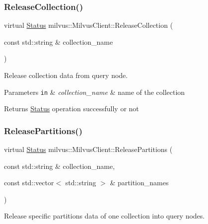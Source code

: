 \subsubsection{\texorpdfstring{Release\+Collection()}{ReleaseCollection()}}
{\footnotesize\ttfamily virtual \hyperlink{classmilvus_1_1_status}{Status} milvus\+::\+Milvus\+Client\+::\+Release\+Collection (\begin{DoxyParamCaption}\item[{const std\+::string \&}]{collection\+\_\+name }\end{DoxyParamCaption})\hspace{0.3cm}{\ttfamily [pure virtual]}}

Release collection data from query node.


\begin{DoxyParams}[1]{Parameters}
\mbox{\tt in}  & {\em collection\+\_\+name} & name of the collection \\
\hline
\end{DoxyParams}
\begin{DoxyReturn}{Returns}
\hyperlink{classmilvus_1_1_status}{Status} operation successfully or not 
\end{DoxyReturn}
\mbox{\label{classmilvus_1_1_milvus_client_a24576d00b4baa08d13de0d9eecffc7bd}} 
\subsubsection{\texorpdfstring{Release\+Partitions()}{ReleasePartitions()}}
{\footnotesize\ttfamily virtual \hyperlink{classmilvus_1_1_status}{Status} milvus\+::\+Milvus\+Client\+::\+Release\+Partitions (\begin{DoxyParamCaption}\item[{const std\+::string \&}]{collection\+\_\+name,  }\item[{const std\+::vector$<$ std\+::string $>$ \&}]{partition\+\_\+names }\end{DoxyParamCaption})\hspace{0.3cm}{\ttfamily [pure virtual]}}

Release specific partitions data of one collection into query nodes.


